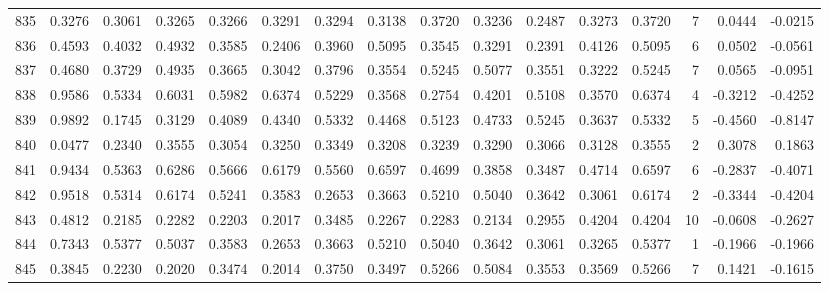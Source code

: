 \begin{tabular}{lrrrrrrrrrrrrrrr}
835 &      0.3276 &  0.3061 &  0.3265 &  0.3266 &  0.3291 &  0.3294 &  0.3138 &  0.3720 &  0.3236 &  0.2487 &   0.3273 &     0.3720 &      7 &                    0.0444 &                    -0.0215 \\
836 &      0.4593 &  0.4032 &  0.4932 &  0.3585 &  0.2406 &  0.3960 &  0.5095 &  0.3545 &  0.3291 &  0.2391 &   0.4126 &     0.5095 &      6 &                    0.0502 &                    -0.0561 \\
837 &      0.4680 &  0.3729 &  0.4935 &  0.3665 &  0.3042 &  0.3796 &  0.3554 &  0.5245 &  0.5077 &  0.3551 &   0.3222 &     0.5245 &      7 &                    0.0565 &                    -0.0951 \\
838 &      0.9586 &  0.5334 &  0.6031 &  0.5982 &  0.6374 &  0.5229 &  0.3568 &  0.2754 &  0.4201 &  0.5108 &   0.3570 &     0.6374 &      4 &                   -0.3212 &                    -0.4252 \\
839 &      0.9892 &  0.1745 &  0.3129 &  0.4089 &  0.4340 &  0.5332 &  0.4468 &  0.5123 &  0.4733 &  0.5245 &   0.3637 &     0.5332 &      5 &                   -0.4560 &                    -0.8147 \\
840 &      0.0477 &  0.2340 &  0.3555 &  0.3054 &  0.3250 &  0.3349 &  0.3208 &  0.3239 &  0.3290 &  0.3066 &   0.3128 &     0.3555 &      2 &                    0.3078 &                     0.1863 \\
841 &      0.9434 &  0.5363 &  0.6286 &  0.5666 &  0.6179 &  0.5560 &  0.6597 &  0.4699 &  0.3858 &  0.3487 &   0.4714 &     0.6597 &      6 &                   -0.2837 &                    -0.4071 \\
842 &      0.9518 &  0.5314 &  0.6174 &  0.5241 &  0.3583 &  0.2653 &  0.3663 &  0.5210 &  0.5040 &  0.3642 &   0.3061 &     0.6174 &      2 &                   -0.3344 &                    -0.4204 \\
843 &      0.4812 &  0.2185 &  0.2282 &  0.2203 &  0.2017 &  0.3485 &  0.2267 &  0.2283 &  0.2134 &  0.2955 &   0.4204 &     0.4204 &     10 &                   -0.0608 &                    -0.2627 \\
844 &      0.7343 &  0.5377 &  0.5037 &  0.3583 &  0.2653 &  0.3663 &  0.5210 &  0.5040 &  0.3642 &  0.3061 &   0.3265 &     0.5377 &      1 &                   -0.1966 &                    -0.1966 \\
845 &      0.3845 &  0.2230 &  0.2020 &  0.3474 &  0.2014 &  0.3750 &  0.3497 &  0.5266 &  0.5084 &  0.3553 &   0.3569 &     0.5266 &      7 &                    0.1421 &                    -0.1615 \\

\end{tabular}

